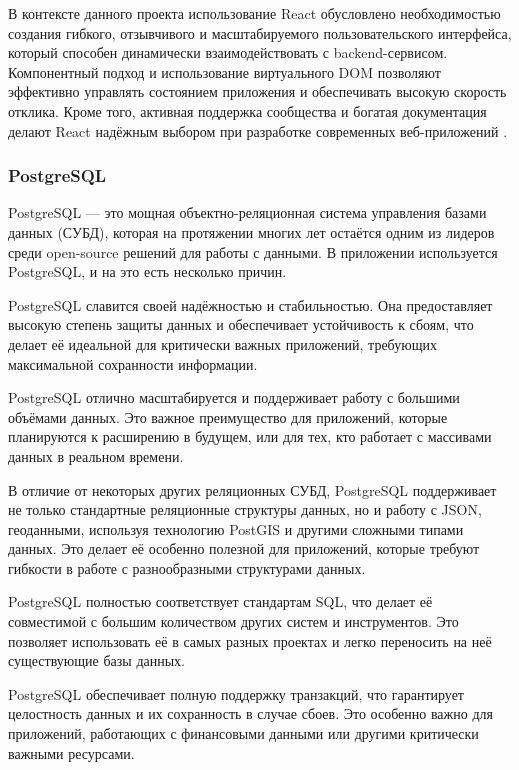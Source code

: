 \documentclass[diploma]{SCWorks}
\begin{document}
В контексте данного проекта использование React обусловлено 
необходимостью создания гибкого, отзывчивого и масштабируемого 
пользовательского интерфейса, который способен динамически взаимодействовать 
с backend-сервисом. Компонентный подход и использование виртуального DOM 
позволяют эффективно управлять состоянием приложения и обеспечивать высокую 
скорость отклика. Кроме того, активная поддержка сообщества и богатая 
документация делают React надёжным выбором при разработке современных 
веб-приложений \cite{react-docs,react-mdn}.

\subsubsection{PostgreSQL}

PostgreSQL — это мощная объектно-реляционная система управления 
базами данных (СУБД), которая на протяжении многих лет остаётся 
одним из лидеров среди open-source решений для работы с данными. 
В приложении используется PostgreSQL, и на это есть несколько причин.

PostgreSQL славится своей надёжностью и стабильностью.
Она предоставляет высокую степень защиты данных и обеспечивает 
устойчивость к сбоям, что делает её идеальной для критически 
важных приложений, требующих максимальной сохранности информации.

PostgreSQL отлично масштабируется и поддерживает работу с большими
объёмами данных. Это важное преимущество для приложений, 
которые планируются к расширению в будущем, или для тех, кто 
работает с массивами данных в реальном времени.

В отличие от некоторых других реляционных СУБД, PostgreSQL
поддерживает не только стандартные реляционные структуры данных, 
но и работу с JSON, геоданными, используя технологию PostGIS 
и другими сложными типами данных. Это делает её особенно полезной 
для приложений, которые требуют гибкости в работе с 
разнообразными структурами данных.

PostgreSQL полностью соответствует стандартам SQL, что делает 
её совместимой с большим количеством других систем и инструментов. 
Это позволяет использовать её в самых разных проектах и легко 
переносить на неё существующие базы данных.

PostgreSQL обеспечивает полную поддержку транзакций, что гарантирует 
целостность данных и их сохранность в случае сбоев. Это особенно 
важно для приложений, работающих с финансовыми данными или 
другими критически важными ресурсами.
\end{document}
